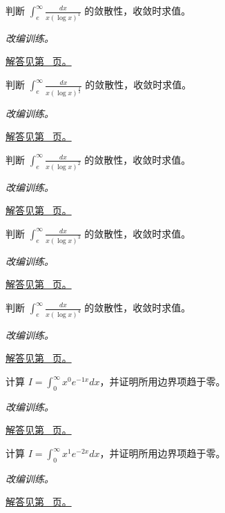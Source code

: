 \documentclass[12pt,fontset=fandol]{ctexart}
\begin{document}
\begin{example}[对数修正的临界情形]\label{ex:c19q15}
判断 $\displaystyle\int_e^\infty\frac{dx}{x(\log x)^{1}}$ 的敛散性，收敛时求值。
\par\textit{改编训练。}\par\hyperref[ans:c19q15]{解答见第~\pageref{ans:c19q15} 页。}
\end{example}
\begin{example}[对数修正的临界情形]\label{ex:c19q16}
判断 $\displaystyle\int_e^\infty\frac{dx}{x(\log x)^{\frac{3}{2}}}$ 的敛散性，收敛时求值。
\par\textit{改编训练。}\par\hyperref[ans:c19q16]{解答见第~\pageref{ans:c19q16} 页。}
\end{example}
\begin{example}[对数修正的临界情形]\label{ex:c19q17}
判断 $\displaystyle\int_e^\infty\frac{dx}{x(\log x)^{2}}$ 的敛散性，收敛时求值。
\par\textit{改编训练。}\par\hyperref[ans:c19q17]{解答见第~\pageref{ans:c19q17} 页。}
\end{example}
\begin{example}[对数修正的临界情形]\label{ex:c19q18}
判断 $\displaystyle\int_e^\infty\frac{dx}{x(\log x)^{3}}$ 的敛散性，收敛时求值。
\par\textit{改编训练。}\par\hyperref[ans:c19q18]{解答见第~\pageref{ans:c19q18} 页。}
\end{example}
\begin{example}[对数修正的临界情形]\label{ex:c19q19}
判断 $\displaystyle\int_e^\infty\frac{dx}{x(\log x)^{4}}$ 的敛散性，收敛时求值。
\par\textit{改编训练。}\par\hyperref[ans:c19q19]{解答见第~\pageref{ans:c19q19} 页。}
\end{example}
\begin{example}[指数衰减积分的递推]\label{ex:c19q20}
计算 $I=\displaystyle\int_0^\infty x^{0}e^{-1x}dx$，并证明所用边界项趋于零。
\par\textit{改编训练。}\par\hyperref[ans:c19q20]{解答见第~\pageref{ans:c19q20} 页。}
\end{example}
\begin{example}[指数衰减积分的递推]\label{ex:c19q21}
计算 $I=\displaystyle\int_0^\infty x^{1}e^{-2x}dx$，并证明所用边界项趋于零。
\par\textit{改编训练。}\par\hyperref[ans:c19q21]{解答见第~\pageref{ans:c19q21} 页。}
\end{example}
\end{document}
